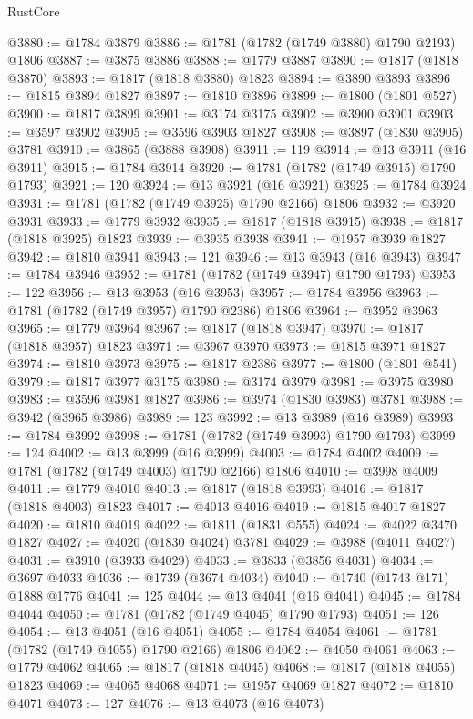 \begin{lexlean}{RustCore}
\begin{coremodule}
@3880 := @1784 @3879
@3886 := @1781 (@1782 (@1749 @3880) @1790 @2193) @1806
@3887 := @3875 @3886
@3888 := @1779 @3887
@3890 := @1817 (@1818 @3870)
@3893 := @1817 (@1818 @3880) @1823
@3894 := @3890 @3893
@3896 := @1815 @3894 @1827
@3897 := @1810 @3896
@3899 := @1800 (@1801 @527)
@3900 := @1817 @3899
@3901 := @3174 @3175
@3902 := @3900 @3901
@3903 := @3597 @3902
@3905 := @3596 @3903 @1827
@3908 := @3897 (@1830 @3905) @3781
@3910 := @3865 (@3888 @3908)
@3911 := 119
@3914 := @13 @3911 (@16 @3911)
@3915 := @1784 @3914
@3920 := @1781 (@1782 (@1749 @3915) @1790 @1793)
@3921 := 120
@3924 := @13 @3921 (@16 @3921)
@3925 := @1784 @3924
@3931 := @1781 (@1782 (@1749 @3925) @1790 @2166) @1806
@3932 := @3920 @3931
@3933 := @1779 @3932
@3935 := @1817 (@1818 @3915)
@3938 := @1817 (@1818 @3925) @1823
@3939 := @3935 @3938
@3941 := @1957 @3939 @1827
@3942 := @1810 @3941
@3943 := 121
@3946 := @13 @3943 (@16 @3943)
@3947 := @1784 @3946
@3952 := @1781 (@1782 (@1749 @3947) @1790 @1793)
@3953 := 122
@3956 := @13 @3953 (@16 @3953)
@3957 := @1784 @3956
@3963 := @1781 (@1782 (@1749 @3957) @1790 @2386) @1806
@3964 := @3952 @3963
@3965 := @1779 @3964
@3967 := @1817 (@1818 @3947)
@3970 := @1817 (@1818 @3957) @1823
@3971 := @3967 @3970
@3973 := @1815 @3971 @1827
@3974 := @1810 @3973
@3975 := @1817 @2386
@3977 := @1800 (@1801 @541)
@3979 := @1817 @3977 @3175
@3980 := @3174 @3979
@3981 := @3975 @3980
@3983 := @3596 @3981 @1827
@3986 := @3974 (@1830 @3983) @3781
@3988 := @3942 (@3965 @3986)
@3989 := 123
@3992 := @13 @3989 (@16 @3989)
@3993 := @1784 @3992
@3998 := @1781 (@1782 (@1749 @3993) @1790 @1793)
@3999 := 124
@4002 := @13 @3999 (@16 @3999)
@4003 := @1784 @4002
@4009 := @1781 (@1782 (@1749 @4003) @1790 @2166) @1806
@4010 := @3998 @4009
@4011 := @1779 @4010
@4013 := @1817 (@1818 @3993)
@4016 := @1817 (@1818 @4003) @1823
@4017 := @4013 @4016
@4019 := @1815 @4017 @1827
@4020 := @1810 @4019
@4022 := @1811 (@1831 @555)
@4024 := @4022 @3470 @1827
@4027 := @4020 (@1830 @4024) @3781
@4029 := @3988 (@4011 @4027)
@4031 := @3910 (@3933 @4029)
@4033 := @3833 (@3856 @4031)
@4034 := @3697 @4033
@4036 := @1739 (@3674 @4034)
@4040 := @1740 (@1743 @171) @1888 @1776
@4041 := 125
@4044 := @13 @4041 (@16 @4041)
@4045 := @1784 @4044
@4050 := @1781 (@1782 (@1749 @4045) @1790 @1793)
@4051 := 126
@4054 := @13 @4051 (@16 @4051)
@4055 := @1784 @4054
@4061 := @1781 (@1782 (@1749 @4055) @1790 @2166) @1806
@4062 := @4050 @4061
@4063 := @1779 @4062
@4065 := @1817 (@1818 @4045)
@4068 := @1817 (@1818 @4055) @1823
@4069 := @4065 @4068
@4071 := @1957 @4069 @1827
@4072 := @1810 @4071
@4073 := 127
@4076 := @13 @4073 (@16 @4073)

\end{coremodule}
\end{lexlean}
